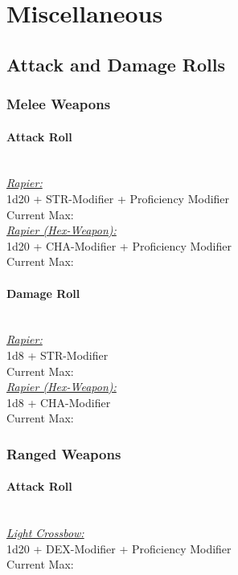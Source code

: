 {\vfill\eject
\section*{Miscellaneous}
\subsection*{Attack and Damage Rolls}
\subsubsection*{Melee Weapons}
\paragraph*{Attack Roll}\hfill\\
\underline{\textit{Rapier:}}\\
1d20 + STR-Modifier + Proficiency Modifier\\
\indent Current Max: \\
\underline{\textit{Rapier (Hex-Weapon):}}\\
1d20 + CHA-Modifier + Proficiency Modifier\\
\indent Current Max: 
\paragraph*{Damage Roll}\hfill\\
\underline{\textit{Rapier:}}\\
1d8 + STR-Modifier\\
\indent Current Max: \\
\underline{\textit{Rapier (Hex-Weapon):}}\\
1d8 + CHA-Modifier\\
\indent Current Max: 
\subsubsection*{Ranged Weapons}
\paragraph*{Attack Roll}\hfill\\
\underline{\textit{Light Crossbow:}}\\
1d20 + DEX-Modifier + Proficiency Modifier\\
\indent Current Max: 
}

